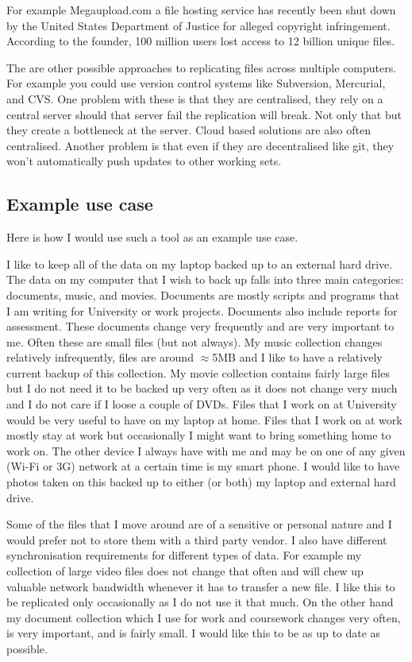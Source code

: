 \documentclass[12pt]{article}
\begin{document}
For example Megaupload.com a file hosting service
has recently been shut down by the United States Department of
Justice for alleged copyright infringement. According to
the founder, 100 million users lost access to 12 billion
unique files\cite{dotcom-trial}.

The are other possible approaches to replicating files
across multiple computers. For example you could use
version control systems like Subversion, Mercurial, and
CVS. One problem with these is that they are
centralised, 
they rely on a central server should that
server fail the replication will break. Not only
that but they create a bottleneck at the server.
Cloud based solutions are also often centralised. 
Another problem is that even if they are decentralised
like git, they won't automatically push updates to other
working sets.


\subsection*{Example use case}
Here is how I would use such a tool as an example use case.

I like to keep all of the data on my laptop backed up to an
external hard drive. The data on my computer that I wish
to back up falls into three main categories: documents, music, and movies.
Documents are mostly scripts and programs that I am writing for
University or work projects. Documents also include reports for
assessment. These documents change very frequently and are very important
to me. Often these are small files (but not always). My music collection
changes relatively infrequently, files are around $\approx$5MB and I like to
have a relatively current backup of this collection. My movie collection
contains fairly large files but I do not need it to be backed up very often
as it does not change very much and I do not care if I loose a couple of
DVDs. Files that I work on at University would be very useful to have
on my laptop at home. Files that I work on at work mostly stay at work
but occasionally I might want to bring something home to work on.
The other device I always have with me and may be on one of any given
(Wi-Fi or 3G) network at a certain time is my smart phone. I would like
to have photos taken on this backed up to either (or both) my laptop and
external hard drive. 

Some of the files that I move around are of a sensitive or personal nature
and I would prefer not to store them with a third party vendor.
I also have different synchronisation requirements for different
types of data. 
For example my collection of large video files does not change that often
and will chew up valuable network bandwidth whenever it has to transfer
a new file. I like this to be replicated only occasionally as I do not
use it that much. On the other hand my document collection which I use
for work and coursework changes very often, is very important, and
is fairly small. I would like this to be as up to date as possible.
\end{document}
